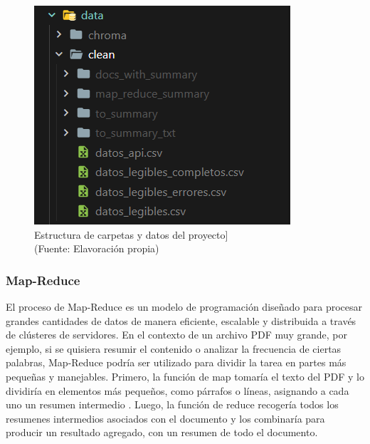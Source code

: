  \begin{figure}[ht!]
    \centering
    \includegraphics[width=.5\textwidth]{figures/huemulFOLDERS.png}
    \caption[Estructura de carpetas y datos del proyecto]{Estructura de carpetas y datos del proyecto]\\
    {\scriptsize (Fuente: Elavoración propia)}}
    \label{fig:chatbot1}
\end{figure}

\subsubsection{Map-Reduce}


\par El proceso de Map-Reduce es un modelo de programación diseñado para procesar grandes cantidades de datos de manera eficiente, 
escalable y distribuida a través de clústeres de servidores. En el contexto de un archivo PDF muy grande, por ejemplo, si se quisiera resumir 
el contenido o analizar la frecuencia de ciertas palabras, Map-Reduce podría ser utilizado para dividir la tarea en partes más pequeñas y manejables. 
Primero, la función de map tomaría el texto del PDF y lo dividiría en elementos más pequeños, como párrafos o líneas, 
asignando a cada uno un resumen intermedio \cite{mapreduce}. Luego, la función de reduce recogería todos los resumenes intermedios asociados con el documento 
y los combinaría para producir un resultado agregado, con un resumen de todo el documento. 


